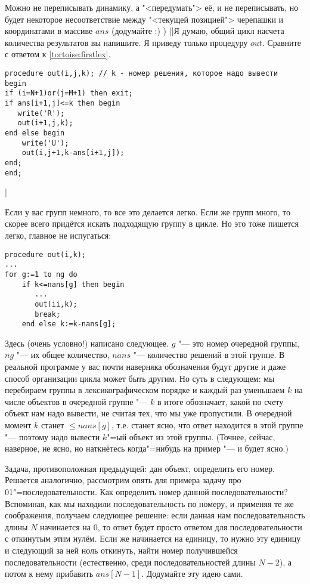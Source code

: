 Можно не переписывать динамику, а "<передумать"> её, и не переписывать, но будет некоторое 
несоответствие между "<текущей позицией"> черепашки и координатами в массиве $ans$ (додумайте :) )
||Я думаю, общий цикл насчета количества результатов вы напишите. Я приведу только процедуру $out$. 
Сравните с ответом к \ref{tortoise:firstlex}.
\begin{codesampleo}\begin{verbatim}
procedure out(i,j,k); // k - номер решения, которое надо вывести
begin
if (i=N+1)or(j=M+1) then exit;
if ans[i+1,j]<=k then begin
   write('R');
   out(i+1,j,k);
end else begin
    write('U');
    out(i,j+1,k-ans[i+1,j]);
end;
end;
\end{verbatim}
\end{codesampleo}
|\label{tortoise:kth}


Если у вас групп немного, то все это делается легко. Если же групп много, то скорее всего
придётся искать подходящую группу в цикле. Но это тоже пишется легко, главное не испугаться:
\begin{codesampleo}\begin{verbatim}
procedure out(i,k);
...
for g:=1 to ng do
    if k<=nans[g] then begin
       ...
       out(ii,k);
       break;
    end else k:=k-nans[g];
\end{verbatim}\end{codesampleo}
Здесь (очень условно!) написано следующее. $g$ "--- это номер очередной группы, $ng$ "--- их
общее количество, $nans$ "--- количество решений в этой группе. В реальной программе у вас
почти наверняка обозначения будут другие и даже способ организации цикла может быть другим.
Но суть в следующем: мы перебираем группы в лексикографическом порядке и каждый раз уменьшаем 
$k$ на числе объектов в очередной группе "--- $k$ в итоге обозначает,
какой по счету объект нам надо вывести, не считая тех, что мы уже пропустили. В очередной
момент $k$ станет $\leq nans[g]$, т.е. станет ясно, что ответ находится в этой группе "---
поэтому надо вывести $k$"=ый объект из этой группы. (Точнее, сейчас, наверное, не ясно,
но наткнётесь когда"=нибудь на пример "--- и будет ясно.)

 Задача, противоположная предыдущей: дан объект, определить 
его номер. Решается аналогично, рассмотрим опять для примера задачу про 01"=последовательности. Как 
определить номер данной последовательности? Вспоминая, как мы находили последовательность по 
номеру, и применяя те же соображения, получаем следующее решение: если данная нам 
последовательность длины $N$ начинается на 0, то ответ будет просто ответом для последовательности с 
откинутым этим нулём. Если же начинается на единицу, то нужно эту единицу и следующий за ней ноль 
откинуть, найти номер получившейся последовательности (естественно, среди последовательностей длины 
$N-2$), а потом к нему прибавить $ans[N-1]$. Додумайте эту идею сами.

